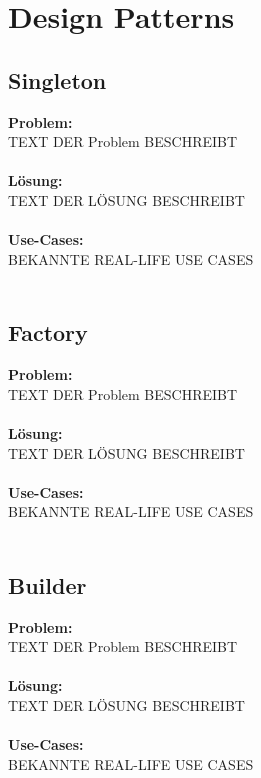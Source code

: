 \documentclass[../main.tex]{subfiles}
\begin{document}
	
	\section{Design Patterns}
	
	\subsection{Singleton}
	\textbf{Problem:}\\
	TEXT DER Problem BESCHREIBT\\\\
	\textbf{Lösung:}\\
	TEXT DER LÖSUNG BESCHREIBT\\\\
	\textbf{Use-Cases:}\\
	BEKANNTE REAL-LIFE USE CASES\\\\
	\clearpage
	
	\subsection{Factory}
	\textbf{Problem:}\\
	TEXT DER Problem BESCHREIBT\\\\
	\textbf{Lösung:}\\
	TEXT DER LÖSUNG BESCHREIBT\\\\
	\textbf{Use-Cases:}\\
	BEKANNTE REAL-LIFE USE CASES\\\\
	\clearpage
	
	\subsection{Builder}
	\textbf{Problem:}\\
	TEXT DER Problem BESCHREIBT\\\\
	\textbf{Lösung:}\\
	TEXT DER LÖSUNG BESCHREIBT\\\\
	\textbf{Use-Cases:}\\
	BEKANNTE REAL-LIFE USE CASES\\\\
	\clearpage
	
\end{document}
